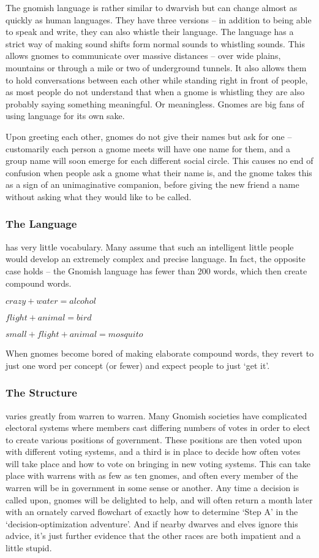 \begin{multicols}{2}
The gnomish language is rather similar to dwarvish but can change almost as quickly as human languages.
They have three versions -- in addition to being able to speak and write, they can also whistle their language.
The language has a strict way of making sound shifts form normal sounds to whistling sounds.
This allows gnomes to communicate over massive distances -- over wide plains, mountains or through a mile or two of underground tunnels.
It also allows them to hold conversations between each other while standing right in front of people, as most people do not understand that when a gnome is whistling they are also probably saying something meaningful.
Or meaningless.
Gnomes are big fans of using language for its own sake. 

Upon greeting each other, gnomes do not give their names but ask for one -- customarily each person a gnome meets will have one name for them, and a group name will soon emerge for each different social circle. This causes no end of confusion when people ask a gnome what their name is, and the gnome takes this as a sign of an unimaginative companion, before giving the new friend a name without asking what they would like to be called.

\subsubsection{The Language}
has very little vocabulary.
Many assume that such an intelligent little people would develop an extremely complex and precise language.
In fact, the opposite case holds -- the Gnomish language has fewer than 200 words, which then create compound words.

$crazy + water = alcohol$

$flight + animal = bird$

$small + flight + animal = mosquito$

When gnomes become bored of making elaborate compound words, they revert to just one word per concept (or fewer) and expect people to just `get it'.

\subsubsection{The Structure}
varies greatly from warren to warren.
Many Gnomish societies have complicated electoral systems where members cast differing numbers of votes in order to elect to create various positions of government.
These positions are then voted upon with different voting systems, and a third is in place to decide how often votes will take place and how to vote on bringing in new voting systems.
This can take place with warrens with as few as ten gnomes, and often every member of the warren will be in government in some sense or another.
Any time a decision is called upon, gnomes will be delighted to help, and will often return a month later with an ornately carved flowchart of exactly how to determine `Step A' in the `decision-optimization adventure'.
And if nearby dwarves and elves ignore this advice, it's just further evidence that the other races are both impatient and a little stupid.


\end{multicols}
